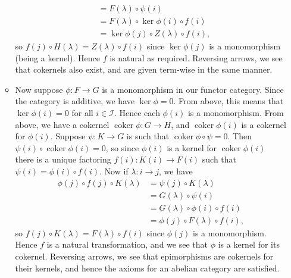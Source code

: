 \documentclass{report}
\newcommand{\I}{\mathscr{I}}
\DeclareMathOperator{\coker}{coker}
\begin{document}
\begin{enumerate}[label=\textbf{2.3.\Alph*.}]
\begin{itemize}
\begin{align*}
			             & = F(\lambda)\circ\psi(i)                 \\
			             & = F(\lambda)\circ\ker\phi(i)\circ f(i)   \\
			             & = \ker\phi(j)\circ Z(\lambda)\circ f(i),
		            \end{align*}
		            so $f(j)\circ H(\lambda)=Z(\lambda)\circ f(i)$ since
		            $\ker\phi(j)$ is a monomorphism (being a kernel). Hence $f$
		            is natural as required. Reversing arrows, we see that
		            cokernels also exist, and are given term-wise in the same
		            manner.

		      \item Now suppose $\phi:F\to G$ is a monomorphism in our functor
		            category. Since the category is additive, we have
		            $\ker\phi=0$. From above, this means that $\ker\phi(i)=0$
		            for all $i\in\I$. Hence each $\phi(i)$ is a monomorphism.
		            From above, we have a cokernel $\coker\phi:G\to H$, and
		            $\coker\phi(i)$ is a cokernel for $\phi(i)$. Suppose
		            $\psi:K\to G$ is such that $\coker\phi\circ\psi=0$. Then
		            $\psi(i)\circ\coker\phi(i)=0$, so since $\phi(i)$ is a
		            kernel for $\coker\phi(i)$ there is a unique factoring
		            $f(i):K(i)\to F(i)$ such that $\psi(i)=\phi(i)\circ f(i)$.
		            Now if $\lambda:i\to j$, we have
		            \begin{align*}
			            \phi(j)\circ f(j)\circ K(\lambda)
			             & = \psi(j)\circ K(\lambda)            \\
			             & = G(\lambda)\circ\psi(i)             \\
			             & = G(\lambda)\circ\phi(i)\circ f(i)   \\
			             & = \phi(j)\circ F(\lambda)\circ f(i),
		            \end{align*}
		            so $f(j)\circ K(\lambda)=F(\lambda)\circ f(i)$ since
		            $\phi(j)$ is a monomorphism. Hence $f$ is a natural
		            transformation, and we see that $\phi$ is a kernel for its
		            cokernel. Reversing arrows, we see that epimorphisms are
		            cokernels for their kernels, and hence the axioms for an
		            abelian category are satisfied.
	      \end{itemize}


\end{enumerate}
\end{document}

